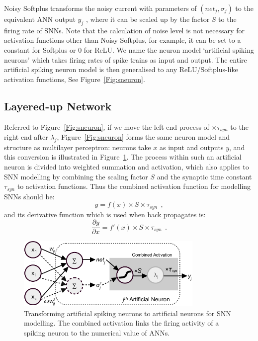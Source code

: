 \documentclass{article}
\begin{document}
Noisy Softplus transforms the noisy current with parameters of $(net_j, \sigma_j)$ to the equivalent ANN output $y_j$ , where it can be scaled up by the factor $S$ to the firing rate of SNNs.
Note that the calculation of noise level is not necessary for activation functions other than Noisy Softplus, for example, it can be set to a constant for Softplus or 0 for ReLU.
We name the neuron model `artificial spiking neurons' which takes firing rates of spike trains as input and output. 
The entire artificial spiking neuron model is then generalised to any ReLU/Softplus-like activation functions, See Figure~\ref{Fig:sneuron}.


\subsection{Layered-up Network}
\label{subsec:ns_train}
Referred to Figure~\ref{Fig:sneuron}, if we move the left end process of $\times \tau_{syn}$ to the right end after $\lambda_j$, Figure~\ref{Fig:sneuron} forms the same neuron model and structure as multilayer perceptron: neurons take $x$ as input and outputs $y$, and this conversion is illustrated in Figure~\ref{Fig:tneuron}.
The process within such an artificial neuron is divided into weighted summation and activation, which also applies to SNN modelling by combining the scaling factor $S$ and the synaptic time constant $\tau_{syn}$ to activation functions.
Thus the combined activation function for modelling SNNs should be:
\begin{equation}
y = f(x) \times S \times \tau_{syn}~~,
\label{equ:full_act}
\end{equation}
and its derivative function which is used when back propagates is:
\begin{equation}
\frac{\partial y}{\partial x} = f'(x) \times S \times \tau_{syn}~~.
\end{equation}

\begin{figure}[tbh!]
	\centering
	\includegraphics[width=0.8\textwidth]{pics_iconip/neuron_t.pdf}
	\caption{Transforming artificial spiking neurons to artificial neurons for SNN modelling. The combined activation links the firing activity of a spiking neuron to the numerical value of ANNs.}
	\label{Fig:tneuron}
\end{figure}
\end{document}
